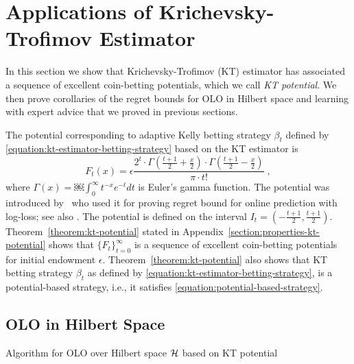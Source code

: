 \section{Applications of Krichevsky-Trofimov Estimator}
\label{section:kt-estimator}

In this section we show that Krichevsky-Trofimov (KT) estimator has associated a
sequence of excellent coin-betting potentials, which we call \emph{KT
potential}. We then prove corollaries of the regret bounds for OLO in Hilbert
space and learning with expert advice that we proved in previous sections.

The potential corresponding to adaptive Kelly betting strategy
$\beta_t$ defined by \eqref{equation:kt-estimator-betting-strategy}
based on the KT estimator is
\begin{equation}
\label{equation:kt-estimator-potential}
F_t(x) = \epsilon \frac{2^t \cdot \Gamma \left( \frac{t+1}{2} + \frac{x}{2} \right) \cdot \Gamma \left( \frac{t+1}{2} - \frac{x}{2} \right)}{\pi \cdot t!} \; ,
\end{equation}
where $\Gamma(x) = ￼\int_0^\infty t^{-x} e^{-t} dt$ is Euler's gamma function.
The potential was introduced by~\citet{KrichevskyT81} who used it for proving
regret bound for online prediction with log-loss; see also \cite[Section
9.7]{Cesa-BianchiL06}. The potential is defined on the interval $I_t =
(-\frac{t+1}{2}, \frac{t+1}{2})$. Theorem~\ref{theorem:kt-potential} stated in
Appendix~\ref{section:properties-kt-potential} shows that $\{F_t\}_{t=0}^\infty$
is a sequence of excellent coin-betting potentials for initial endowment
$\epsilon$. Theorem~\ref{theorem:kt-potential} also shows that KT betting
strategy $\beta_t$ as defined by \eqref{equation:kt-estimator-betting-strategy},
is a potential-based strategy, i.e., it satisfies
\eqref{equation:potential-based-strategy}.

\subsection{OLO in Hilbert Space}

\begin{algorithm}[t]
\caption{Algorithm for OLO over Hilbert space $\mathcal{H}$ based on KT potential
\label{algorithm:kt-hilbert-space-olo}}
\begin{algorithmic}
{
\ENDFOR
}
\end{algorithmic}
\end{algorithm}

